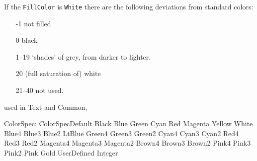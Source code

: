 \documentclass[10pt, a4paper]{article}
\begin{document}
If the \texttt{FillColor} is \texttt{White} there are the following deviations 
from standard colors: 
%
\begin{enumerate}
\item[-1]    not filled
\item[0]     black
\item[1--19]  `shades' of grey, from darker to lighter.
\item[20]    (full saturation of) white
\item[21--40] not used. 
\end{enumerate}



used in Text and Common, 

ColorSpec:
ColorSpecDefault	 
Black	 
Blue	 
Green	 
Cyan	 
Red	 
Magenta	 
Yellow	 
White	 
Blue4	 
Blue3	 
Blue2	 
LtBlue	 
Green4	 
Green3	 
Green2	 
Cyan4	 
Cyan3	 
Cyan2	 
Red4	 
Red3	 
Red2	 
Magenta4	 
Magenta3	 
Magenta2	 
Brown4	 
Brown3	 
Brown2	 
Pink4	 
Pink3	 
Pink2	 
Pink	 
Gold	 
UserDefined Integer	 


{}%
\end{document}
